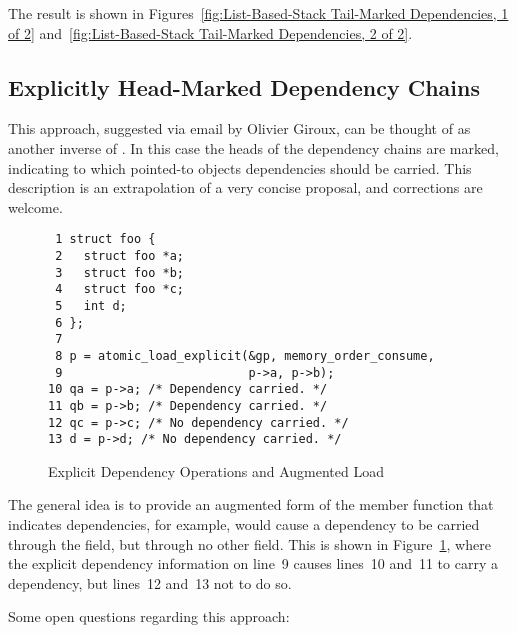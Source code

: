 \documentclass[letterpaper,twocolumn,10pt]{article}
\begin{document}
The result is shown in
Figures~\ref{fig:List-Based-Stack Tail-Marked Dependencies, 1 of 2}
and~\ref{fig:List-Based-Stack Tail-Marked Dependencies, 2 of 2}.

\subsection{Explicitly Head-Marked Dependency Chains}
\label{sec:Explicitly Head-Marked Dependency Chains}

This approach, suggested via email by Olivier Giroux, can be thought of
as another inverse of .
In this case the heads of the dependency chains are marked, indicating
to which pointed-to objects dependencies should be carried.
This description is an extrapolation of a very concise proposal,
and corrections are welcome.

\begin{figure}[tbp]
{ \scriptsize
\begin{verbatim}
 1 struct foo {
 2   struct foo *a;
 3   struct foo *b;
 4   struct foo *c;
 5   int d;
 6 };
 7 
 8 p = atomic_load_explicit(&gp, memory_order_consume,
 9                          p->a, p->b);
10 qa = p->a; /* Dependency carried. */
11 qb = p->b; /* Dependency carried. */
12 qc = p->c; /* No dependency carried. */
13 d = p->d; /* No dependency carried. */
\end{verbatim}
}
\caption{Explicit Dependency Operations and Augmented Load}
\label{fig:Explicit Dependency Operations and Augmented Load}
\end{figure}

The general idea is to provide an augmented form of the  member
function that indicates dependencies, for example,
 would cause a dependency to
be carried through the  field, but through no other field.
This is shown in
Figure~\ref{fig:Explicit Dependency Operations and Augmented Load},
where the explicit dependency information on line~9 causes lines~10
and~11 to carry a dependency, but lines~12 and~13 not to do so.

Some open questions regarding this approach:
\end{document}
